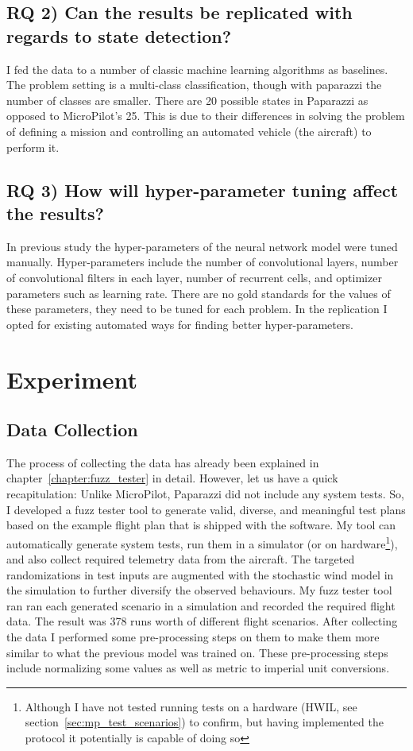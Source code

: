 \subsection{RQ 2) Can the results be replicated with regards to state detection?}
I fed the data to a number of classic machine learning algorithms as baselines. The problem setting is a multi-class classification, though with paparazzi the number of classes are smaller. 
There are 20 possible states in Paparazzi as opposed to MicroPilot's 25. This is due to their differences in solving the problem of defining a mission and controlling an automated vehicle (the aircraft) to perform it.

\subsection{RQ 3) How will hyper-parameter tuning affect the results?}
In previous study the hyper-parameters of the neural network model were tuned manually. Hyper-parameters include the number of convolutional layers, number of convolutional filters in each layer, number of recurrent cells, and optimizer parameters such as learning rate. There are no gold standards for the values of these parameters, they need to be tuned for each problem. In the replication I opted for existing automated ways for finding better hyper-parameters.


\section{Experiment}
\subsection{Data Collection}
The process of collecting the data has already been explained in chapter~\ref{chapter:fuzz_tester} in detail. However, let us have a quick recapitulation:
Unlike MicroPilot, Paparazzi did not include any system tests. So, I developed a fuzz tester tool to generate valid, diverse, and meaningful test plans based on the example flight plan that is shipped with the software. My tool can automatically generate system tests, run them in a simulator (or on hardware\footnote{Although I have not tested running tests on a hardware (HWIL, see section~\ref{sec:mp_test_scenarios}) to confirm, but having implemented the protocol it potentially is capable of doing so}), and also collect required telemetry data from the aircraft. The targeted randomizations in test inputs are augmented with the stochastic wind model in the simulation to further diversify the observed behaviours. My fuzz tester tool ran ran each generated scenario in a simulation and recorded the required flight data.
The result was 378 runs worth of different flight scenarios.
After collecting the data I performed some pre-processing steps on them to make them more similar to what the previous model was trained on. These pre-processing steps include normalizing some values as well as metric to imperial unit conversions.


